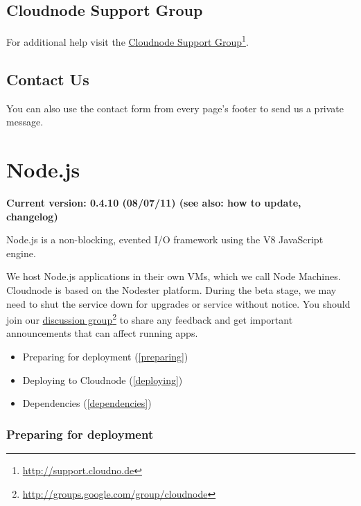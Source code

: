 \section{Cloudnode Support Group}
\label{cloudnodesupportgroup}

For additional help visit the \href{http://support.cloudno.de}{Cloudnode Support Group}\footnote{\href{http://support.cloudno.de}{http:/\slash support.cloudno.de}}.

\section{Contact Us}
\label{contactus}

You can also use the contact form from every page's footer to send us a private message.

\chapter{Node.js}
\label{node.js}

\textbf{Current version: 0.4.10 (08\slash 07\slash 11) (see also: how to update, changelog)}

Node.js is a non-blocking, evented I\slash O framework using the V8 JavaScript engine.

We host Node.js applications in their own VMs, which we call Node Machines. Cloudnode is based on the Nodester platform. During the beta stage, we may need to shut the service down for upgrades or service without notice. You should join our \href{http://groups.google.com/group/cloudnode}{discussion group}\footnote{\href{http://groups.google.com/group/cloudnode}{http:/\slash groups.google.com\slash group\slash cloudnode}} to share any feedback and get important announcements that can affect running apps.

\begin{itemize}
\item Preparing for deployment (\autoref{preparing})

\item Deploying to Cloudnode (\autoref{deploying})

\item Dependencies (\autoref{dependencies})

\end{itemize}



\subsection{Preparing for deployment}
\label{preparingfordeployment}

